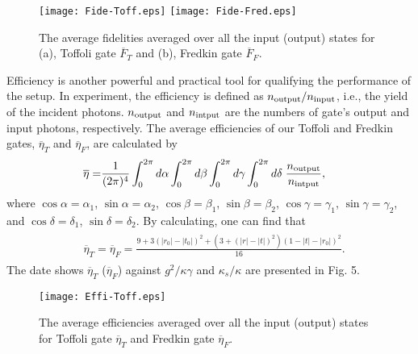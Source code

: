 \documentclass[showpacs,preprintnumbers,showkeys,amsmath,amssymb]{revtex4}%
\begin{document}
\begin{figure}%
\centering
\texttt{[image: Fide-Toff.eps]}%
\;\;\;\;%
\texttt{[image: Fide-Fred.eps]}%
\caption{The average fidelities averaged over all the input (output) states for (a), Toffoli gate $\overline{F}_{T}$ and (b), Fredkin gate $\overline{F}_{F}$.
} \label{Fig4}
\end{figure}




Efficiency is another powerful and practical tool for qualifying the performance of the setup. In experiment, the efficiency is defined as $n_{\rm{output}}/n_{\rm{input}}$, i.e., the yield of the incident photons. $n_{\rm{output}}$ and $n_{\rm{intput}}$ are the numbers of gate's output and input photons, respectively. The average efficiencies of our Toffoli and Fredkin gates, $\overline{\eta}_T$ and $\overline{\eta}_F$, are calculated by
\begin{eqnarray}       \label{eq20}
\begin{split}
\overline{\eta}=&\frac{1}{(2\pi)^4}\int_{0}^{2\pi}d\alpha\int_{0}^{2\pi}d\beta\int_{0}^{2\pi}d\gamma\int_{0}^{2\pi}d\delta \;   \frac{n_{\rm{output}}}{n_{\rm{intput}}},
\end{split}
\end{eqnarray}
where $\cos\alpha=\alpha_1$, $\sin\alpha=\alpha_2$,
$\cos\beta=\beta_1$,  $\sin\beta=\beta_2$,
$\cos\gamma=\gamma_1$,  $\sin\gamma=\gamma_2$, and
$\cos\delta=\delta_1$,  $\sin\delta=\delta_2$. By calculating,  one can find that
\begin{eqnarray}       \label{eq20}
\begin{split}
&\overline{\eta}_T=\overline{\eta}_F=\frac{9+3(|r_0|-|t_0|)^2+(3+(|r|-|t|)^2)(1-|t|-|r_0|)^2}{16}.
\end{split}
\end{eqnarray}
The date shows $\overline{\eta}_T$ ($\overline{\eta}_F$) against $g^2/\kappa\gamma$ and $\kappa_s/\kappa$ are presented in Fig. 5.


\begin{figure}          %
\centering
\texttt{[image: Effi-Toff.eps]}
\caption{The average efficiencies averaged over all the input (output) states for Toffoli gate $\overline{\eta}_{T}$ and Fredkin gate $\overline{\eta}_{F}$.
} \label{Fig5}
\end{figure}
\end{document}
